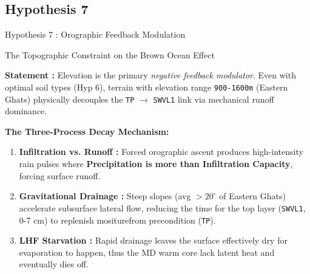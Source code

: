\documentclass[8pt, aspectratio=169]{beamer}
\begin{document}
\subsection{Hypothesis 7}
\begin{frame}{Hypothesis 7 : Orographic Feedback Modulation}
    \vspace{-0.2cm}
    \begin{block}{The Topographic Constraint on the Brown Ocean Effect}\end{block}

    \footnotesize
    \textbf{Statement :} Elevation is the primary \textit{negative feedback modulator}. Even with optimal soil types (Hyp 6), terrain with elevation range \texttt{900-1600m} (Eastern Ghats) physically decouples the \texttt{TP} $\rightarrow$ \texttt{SWVL1} link via mechanical runoff dominance.

    \vspace{0.15cm}
    \footnotesize
    \textbf{The Three-Process Decay Mechanism:}
    \begin{enumerate} \footnotesize
        \item \textbf{Infiltration vs. Runoff :} Forced orographic ascent produces high-intensity rain pulses where \textbf{Precipitation is more than Infiltration Capacity}, forcing surface runoff.
        \item \textbf{Gravitational Drainage :} Steep slopes (avg $>20^\circ$ of Eastern Ghats) accelerate subsurface lateral flow, reducing the time for the top layer (\texttt{SWVL1}, 0-7 cm) to replenish mositurefrom precondition (\texttt{TP}).
        \item \textbf{LHF Starvation :} Rapid drainage leaves the surface effectively dry for evaporation to happen, thus the MD warm core lack latent heat and eventually dies off.
    \end{enumerate}


\end{frame}
\end{document}
